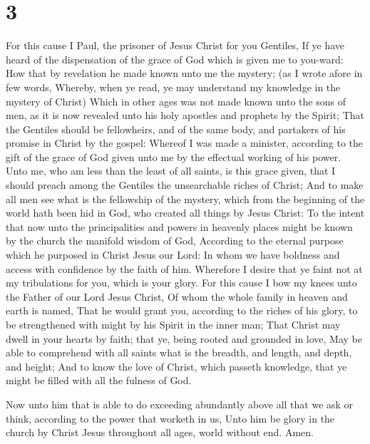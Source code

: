\hypertarget{section-2}{%
\section{3}\label{section-2}}

 For this cause I Paul, the prisoner of Jesus Christ for you
Gentiles,  If ye have heard of the dispensation of the grace
of God which is given me to you-ward:  How that by
revelation he made known unto me the mystery; (as I wrote afore in few
words,  Whereby, when ye read, ye may understand my
knowledge in the mystery of Christ)  Which in other ages was
not made known unto the sons of men, as it is now revealed unto his holy
apostles and prophets by the Spirit;  That the Gentiles
should be fellowheirs, and of the same body, and partakers of his
promise in Christ by the gospel:  Whereof I was made a
minister, according to the gift of the grace of God given unto me by the
effectual working of his power.  Unto me, who am less than
the least of all saints, is this grace given, that I should preach among
the Gentiles the unsearchable riches of Christ;  And to make
all men see what is the fellowship of the mystery, which from the
beginning of the world hath been hid in God, who created all things by
Jesus Christ:  To the intent that now unto the
principalities and powers in heavenly places might be known by the
church the manifold wisdom of God,  According to the
eternal purpose which he purposed in Christ Jesus our Lord:
 In whom we have boldness and access with confidence by the
faith of him.  Wherefore I desire that ye faint not at my
tribulations for you, which is your glory.  For this cause
I bow my knees unto the Father of our Lord Jesus Christ, 
Of whom the whole family in heaven and earth is named, 
That he would grant you, according to the riches of his glory, to be
strengthened with might by his Spirit in the inner man; 
That Christ may dwell in your hearts by faith; that ye, being rooted and
grounded in love,  May be able to comprehend with all
saints what is the breadth, and length, and depth, and height;
 And to know the love of Christ, which passeth knowledge,
that ye might be filled with all the fulness of God.

 Now unto him that is able to do exceeding abundantly above
all that we ask or think, according to the power that worketh in us,
 Unto him be glory in the church by Christ Jesus throughout
all ages, world without end. Amen.

